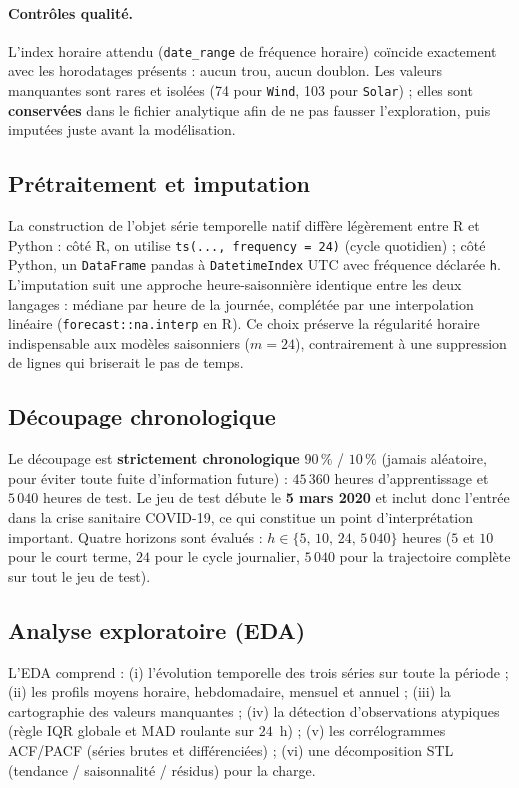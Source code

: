 \paragraph{Contrôles qualité.}
L'index horaire attendu (\texttt{date\_range} de fréquence horaire) coïncide
exactement avec les horodatages présents : aucun trou, aucun doublon. Les
valeurs manquantes sont rares et isolées (74 pour \texttt{Wind}, 103 pour
\texttt{Solar}) ; elles sont \textbf{conservées} dans le fichier analytique
afin de ne pas fausser l'exploration, puis imputées juste avant la
modélisation.

\subsection{Prétraitement et imputation}
La construction de l'objet série temporelle natif diffère légèrement entre R
et Python : côté R, on utilise \texttt{ts(..., frequency = 24)} (cycle
quotidien) ; côté Python, un \texttt{DataFrame} pandas à \texttt{DatetimeIndex}
UTC avec fréquence déclarée \texttt{h}. L'imputation suit une approche
heure-saisonnière identique entre les deux langages : médiane par heure de la
journée, complétée par une interpolation linéaire
(\texttt{forecast::na.interp} en R). Ce choix préserve la régularité horaire
indispensable aux modèles saisonniers (\(m=24\)), contrairement à une
suppression de lignes qui briserait le pas de temps.

\subsection{Découpage chronologique}
Le découpage est \textbf{strictement chronologique} \(90\,\%\) / \(10\,\%\)
(jamais aléatoire, pour éviter toute fuite d'information future) :
\(45\,360\) heures d'apprentissage et \(5\,040\) heures de test. Le jeu de test
débute le \textbf{5 mars 2020} et inclut donc l'entrée dans la crise sanitaire
COVID-19, ce qui constitue un point d'interprétation important. Quatre
horizons sont évalués : \(h \in \{5,\,10,\,24,\,5\,040\}\) heures (\(5\) et
\(10\) pour le court terme, \(24\) pour le cycle journalier, \(5\,040\) pour la
trajectoire complète sur tout le jeu de test).

\subsection{Analyse exploratoire (EDA)}
L'EDA comprend : (i) l'évolution temporelle des trois séries sur toute la
période ; (ii) les profils moyens horaire, hebdomadaire, mensuel et annuel ;
(iii) la cartographie des valeurs manquantes ; (iv) la détection d'observations
atypiques (règle IQR globale et MAD roulante sur \(24\)~h) ; (v) les
corrélogrammes ACF/PACF (séries brutes et différenciées) ; (vi) une
décomposition STL (tendance / saisonnalité / résidus) pour la charge.

